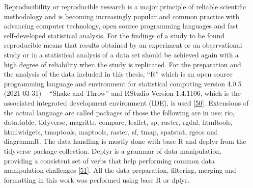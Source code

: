 \documentclass[a4paper,11pt]{article}
\begin{document}
Reproducibility or reproducible research is a major principle of reliable scientific methodology and is becoming increasingly popular and common practice with advancing computer technology, open source programming languages and fast self-developed statistical analysis. For the findings of a study to be found reproducible means that results obtained by an experiment or an observational study or in a statistical analysis of a data set should be achieved again with a high degree of reliability when the study is replicated. For the preparation and the analysis of the data included in this thesis, ``R'' which is an open source programming language and environment for statistical computing version 4.0.5 (2021-03-31) -- ``Shake and Throw'' and RStudio Version 1.4.1106, which is the associated integrated development environment (IDE), is used {[}\protect\hyperlink{ref-R}{50}{]}. Extensions of the actual language are called packages of those the following are in use: rio, data.table, tidyverse, magrittr, compare, leaflet, sp, raster, rgdal, htmltools, htmlwidgets, tmaptools, maptools, raster, sf, tmap, spatstat, rgeos and diagrammR. The data handling is mostly done with base R and deplyr from the tidyverse package collection. Deplyr is a grammar of data manipulation, providing a consistent set of verbs that help performing common data manipulation challenges {[}\protect\hyperlink{ref-HadleyWickham.2021}{51}{]}. All the data preparation, filtering, merging and formatting in this work was performed using base R or dplyr.
\end{document}
